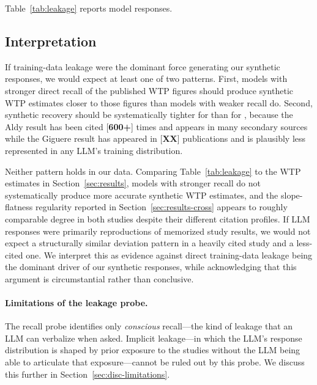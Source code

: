 \documentclass[12pt]{article}
\begin{document}
Table~\ref{tab:leakage} reports model responses.

\label{tab:leakage}

\subsection{Interpretation}

If training-data leakage were the dominant force generating our synthetic
responses, we would expect at least one of two patterns. First, models
with stronger direct recall of the published WTP figures should produce
synthetic WTP estimates closer to those figures than models with weaker
recall do. Second, synthetic recovery should be systematically tighter
for \textcite{Aldy2012} than for \textcite{Giguere2020}, because the Aldy
result has been cited [\textbf{600+}] times and appears in many secondary
sources while the Giguere result has appeared in [\textbf{XX}]
publications and is plausibly less represented in any LLM's training
distribution.

Neither pattern holds in our data. Comparing Table~\ref{tab:leakage} to
the WTP estimates in Section~\ref{sec:results}, models with stronger
recall do not systematically produce more accurate synthetic WTP
estimates, and the slope-flatness regularity reported in
Section~\ref{sec:results-cross} appears to roughly comparable degree in
both studies despite their different citation profiles. If LLM responses
were primarily reproductions of memorized study results, we would not
expect a structurally similar deviation pattern in a heavily cited study
and a less-cited one. We interpret this as evidence against direct
training-data leakage being the dominant driver of our synthetic
responses, while acknowledging that this argument is circumstantial
rather than conclusive.

\paragraph{Limitations of the leakage probe.} The recall probe identifies
only \emph{conscious} recall---the kind of leakage that an LLM can
verbalize when asked. Implicit leakage---in which the LLM's response
distribution is shaped by prior exposure to the studies without the LLM
being able to articulate that exposure---cannot be ruled out by this
probe. We discuss this further in Section~\ref{sec:disc-limitations}.
\end{document}
